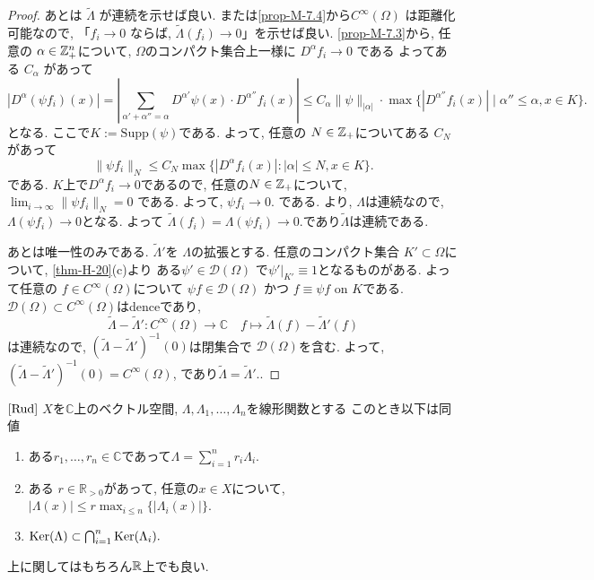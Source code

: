 \begin{proof}
あとは \(\tilde{\Lambda}\) が連続を示せば良い. 
 \cite[Thm 1.32]{Rud}または\ref{prop-M-7.4}から\(C^\infty(\Omega)\) は距離化可能なので, 
「\(f_i \to 0\) ならば,  \(\tilde{\Lambda}(f_i) \to 0\)」を示せば良い. 
\ref{prop-M-7.3}から, 任意の \(\alpha \in \mathbb{Z}_+^n\)について, \(\Omega\)のコンパクト集合上一様に \(D^\alpha f_i \to 0\) である
よってある \(C_\alpha\) があって
\[
|D^\alpha(\psi f_i)(x)| = 
|\sum_{\alpha'+\alpha''=\alpha} D^{\alpha'}\psi(x)\cdot D^{\alpha''}f_i(x)| 
\le C_\alpha \|\psi\|_{|\alpha|} \cdot \max\{|D^{\alpha''}f_i(x)| \mid \alpha''\le \alpha, x\in K\}.
\]
となる. ここで$K:= \mathrm{Supp}(\psi)$である.
よって, 任意の \( N \in \mathbb{Z}_+\)についてある \( C_N\) があって
\[
\|\psi f_i\|_N \le 
C_N \max \{ |D^\alpha f_i(x)| : |\alpha|\le N, x \in K\}.
\]
である. \(K\)上で\(D^\alpha f_i \to 0\)であるので, 
任意の$N \in \mathbb{Z}_+$について, \(\lim_{i \to \infty} \|\psi f_i\|_N = 0\) である.
よって, 
\(\psi f_i \to 0.\) である.  \cite[Thm 6.6]{Rud}より, $\Lambda$は連続なので, 
\(\Lambda(\psi f_i) \to 0\)となる. 
よって
\( \tilde{\Lambda}(f_i) = \Lambda(\psi f_i) \to 0.\)であり\(\tilde{\Lambda}\)は連続である.


あとは唯一性のみである. 
\(\tilde{\Lambda}'\)を \(\Lambda\)の拡張とする. 
任意のコンパクト集合 \( K' \subset \Omega\)について, \ref{thm-H-20}(c)より
 ある\( \psi' \in \mathcal{D}(\Omega)\) で\(\psi'|_{K'} \equiv 1\)となるものがある. 
よって任意の \(f \in C^\infty(\Omega)\)について
\(\psi f \in \mathcal{D}(\Omega)\) かつ \(f \equiv \psi f\) on \(K\)である. 
 \(\mathcal{D}(\Omega) \subset C^\infty(\Omega)\)はdenceであり, 
\[
\tilde{\Lambda} - \tilde{\Lambda}': C^\infty(\Omega) \to \mathbb{C}
\quad
f \mapsto \tilde{\Lambda}(f) - \tilde{\Lambda}'(f)
\]は連続なので, 
\((\tilde{\Lambda}-\tilde{\Lambda}')^{-1}(0)\)は閉集合で \(\mathcal{D}(\Omega)\)を含む.
よって, \( (\tilde{\Lambda}-\tilde{\Lambda}')^{-1}(0) = C^\infty(\Omega)\), であり\(\tilde{\Lambda} = \tilde{\Lambda}'.\).  
\end{proof}



\begin{tcolorbox}[mybox]
\begin{lem}{$\cite[Lem 3.9]{Rud}$}
\label{lem-H-2.1}
\(X\)を\(\mathbb{C}\)上のベクトル空間, 
\(\Lambda, \Lambda_1, \dots, \Lambda_n\)を線形関数とする
このとき以下は同値
\begin{enumerate}
\item ある\(r_1,\dots,r_n \in \mathbb{C}\)であって\(\Lambda = \sum_{i=1}^n r_i \Lambda_i\).  
\item ある \(r \in \mathbb{R}_{>0}\)があって, 任意の$x \in X$について, \(|\Lambda(x)| \le r \max_{i \le n} \{|\Lambda_i(x)|\}\).
\item  \(\mathrm{Ker}(\Lambda) \subset \bigcap_{i=1}^n \mathrm{Ker}(\Lambda_i).\)  
\end{enumerate}
\end{lem}
\end{tcolorbox}
上に関してはもちろん$\mathbb{R}$上でも良い.

